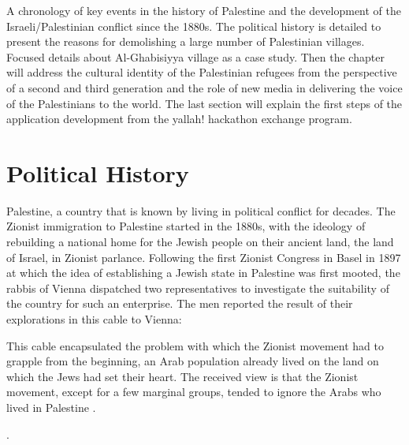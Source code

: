 A chronology of key events in the history of Palestine and the development of the Israeli/Palestinian conflict since the 1880s. The political history is detailed to present the reasons for demolishing a large number of Palestinian villages. Focused details about Al-Ghabisiyya village as a case study. Then the chapter will address the cultural identity of the Palestinian refugees from the perspective of a second and third generation and the role of new media in delivering the voice of the Palestinians to the world. The last section will explain the first steps of the application development from the \acrshort{yallah!} hackathon exchange program.  
\section{Political History}
Palestine, a country that is known by living in political conflict for decades.
The Zionist immigration to Palestine started in the 1880s, with the ideology of rebuilding a national home for the Jewish people on their ancient land, the land of Israel, in Zionist parlance\citep{Morris2004, Pappe2006, Khalidi2015}.
Following the first Zionist Congress in Basel in 1897 at which the idea of
establishing a Jewish state in Palestine was first mooted, the rabbis of Vienna
dispatched two representatives to investigate the suitability of the country for
such an enterprise. The men reported the result of their explorations in this cable
to Vienna:




\centerline{\textit{}}

This cable encapsulated the problem with which the Zionist movement had to grapple from the beginning, an Arab population already lived on the land on which the Jews had set their heart. The received view is that the Zionist movement, except for a few marginal groups, tended to ignore the Arabs who lived in Palestine \citep{Shlaim2014, Karmi2007}.

 \cite[p.11]{Pappe2006}.

